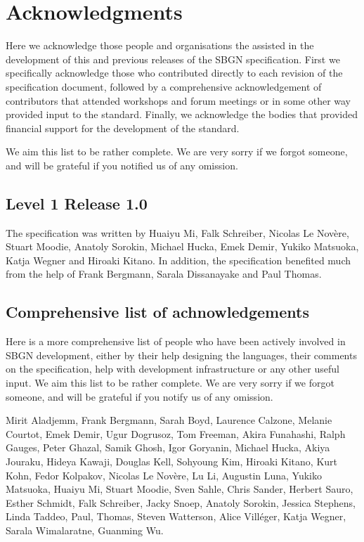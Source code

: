 \chapter{Acknowledgments}\label{sec:acknowledgments}

Here we acknowledge those people and organisations the assisted in the development of this and previous releases of the SBGN \AFl specification. First we specifically acknowledge those who contributed directly to each revision of the  specification document, followed by a comprehensive acknowledgement of contributors that attended workshops and forum meetings or in some other way provided input to the standard. Finally, we acknowledge the bodies that provided financial support for the development of the standard.


 We aim this list to be rather complete. We are very sorry if we forgot someone, and will be grateful if you notified us of any omission.

\section{Level 1 Release 1.0}

The specification was written by Huaiyu Mi, Falk Schreiber, Nicolas Le Nov\`{e}re, Stuart Moodie, Anatoly Sorokin, Michael Hucka, Emek Demir, Yukiko Matsuoka, Katja Wegner and Hiroaki Kitano. In addition, the specification benefited much from the help of Frank Bergmann, Sarala Dissanayake and Paul Thomas.

\section{Comprehensive list of achnowledgements}

Here is a more comprehensive list of people who have been actively involved in SBGN development, either by their help designing the languages, their comments on the specification, help with development infrastructure or any other useful input.  We aim this list to be rather complete. We are very sorry if we forgot someone, and will be grateful if you notify us of any omission.

Mirit Aladjemm, Frank Bergmann, Sarah Boyd, Laurence Calzone, Melanie Courtot, Emek Demir, Ugur Dogrusoz, Tom Freeman, Akira Funahashi, Ralph
Gauges, Peter Ghazal, Samik Ghosh, Igor Goryanin, Michael Hucka, Akiya Jouraku, Hideya Kawaji, Douglas Kell, Sohyoung Kim, Hiroaki Kitano, Kurt
Kohn, Fedor Kolpakov, Nicolas Le Nov\`{e}re, Lu Li, Augustin Luna, Yukiko Matsuoka, Huaiyu Mi, Stuart Moodie, Sven Sahle, Chris Sander, Herbert
Sauro, Esther Schmidt, Falk Schreiber, Jacky Snoep, Anatoly Sorokin, Jessica Stephens, Linda Taddeo, Paul, Thomas, Steven Watterson, Alice Vill\'{e}ger, Katja
Wegner, Sarala Wimalaratne, Guanming Wu.

